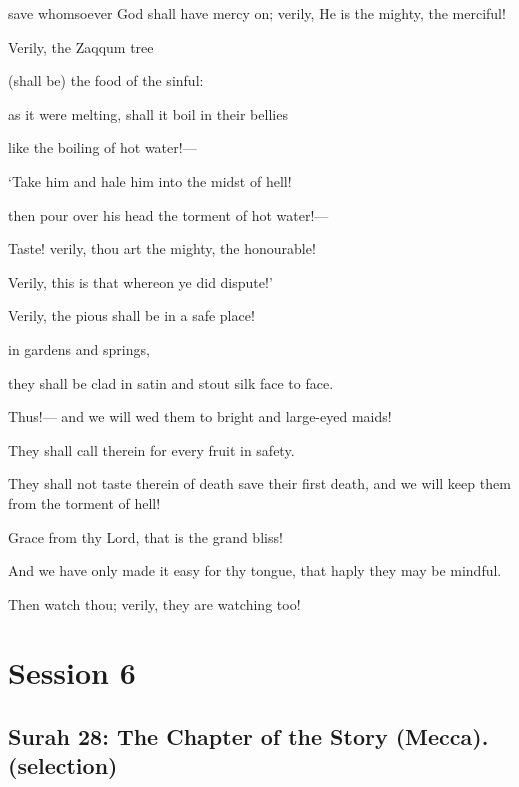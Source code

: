\documentclass[fontsize=14pt, letterpaper, notitlepage, openany, DIV=12]{scrbook} %
\begin{document}
\noindent[44:42]
save whomsoever God shall have mercy on; verily, He is the mighty, the merciful!

\noindent[44:43]
Verily, the Zaqqum tree

\noindent[44:44]
(shall be) the food of the sinful:

\noindent[44:45]
as it were melting, shall it boil in their bellies

\noindent[44:46]
like the boiling of hot water!---

\noindent[44:47]
`Take him and hale him into the midst of hell!

\noindent[44:48]
then pour over his head the torment of hot water!---

\noindent[44:49]
Taste! verily, thou art the mighty, the honourable!

\noindent[44:50]
Verily, this is that whereon ye did dispute!'

\noindent[44:51]
Verily, the pious shall be in a safe place!

\noindent[44:52]
in gardens and springs,

\noindent[44:53]
they shall be clad in satin and stout silk face to face.

\noindent[44:54]
Thus!--- and we will wed them to bright and large-eyed maids!

\noindent[44:55]
They shall call therein for every fruit in safety.

\noindent[44:56]
They shall not taste therein of death save their first death, and we will keep them from the
torment of hell!

\noindent[44:57]
Grace from thy Lord, that is the grand bliss!

\noindent[44:58]
And we have only made it easy for thy tongue, that haply they may be mindful.

\noindent[44:59]
Then watch thou; verily, they are watching too!

\clearpage
\chapter{Session 6}


\section[Surah 28: The Chapter of the Story (Mecca).]{Surah 28: The Chapter of the Story (Mecca).\\ (selection)}
\end{document}
